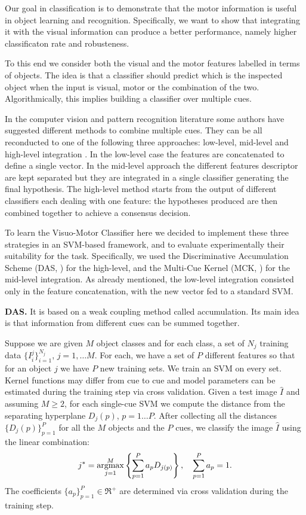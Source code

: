 Our goal in classification is to demonstrate that the motor information is
useful in object learning and recognition. Specifically,  we want 
to show that integrating it with the visual information can 
produce a better performance, namely higher classificaton 
rate and robusteness.

To this end we consider both the visual and the motor features
labelled in terms of objects. The idea is that a classifier 
should predict which is the inspected object when the input is
 visual, motor or the combination 
of the two.
Algorithmically, this implies building a classifier over multiple cues.

In the computer vision and pattern recognition literature 
some authors have suggested different methods to combine
multiple cues. They can be all reconducted to one of the 
following three approaches: low-level, mid-level and high-level
integration \cite{Polikar2006,sanderson2004}. 
In the low-level case the features are concatenated
to define a single vector. In the mid-level approach
the different features descriptor are kept separated 
but they are integrated in a single classifier generating the
final hypothesis. The high-level method starts from
the output of different classifiers each dealing with one feature: 
the hypotheses produced are then combined together to
achieve a consensus decision.

To learn the Visuo-Motor Classifier here we decided to implement these three strategies in an SVM-based framework, and to evaluate
experimentally their suitability for the task. Specifically, 
we used the
Discriminative Accumulation Scheme (DAS, \cite{DAS}) for
the high-level, and the Multi-Cue Kernel (MCK, \cite{MCK}) for the
mid-level integration.
As already mentioned, the low-level integration consisted only in the feature concatenation, with the new vector fed to a standard SVM.


\vspace{0.5cm}

\noindent\textbf{DAS.} It is based on a weak coupling method called accumulation. Its main 
idea is that information from different cues can be summed together.

Suppose we are given $M$ object classes and for each class, a set
of $N_{j}$ training data $\{I^{j}_{i}\}_{i=1}^{N_{j}}$,
$j=1,\ldots M$. For each, we have a set of $P$ different
features so that for an object $j$ we have $P$ new training sets.
We train an SVM on every set. Kernel functions may differ from cue to
cue and model parameters can be estimated during the training step
via cross validation. Given a test image $\hat{I}$ and assuming
$M\geq2$, for each single-cue SVM we compute the distance from the
separating hyperplane $D_{j}(p)$, $p=1\ldots P$.
After collecting all the distances $\{D_{j}(p)\}_{p=1}^{P}$ for
all the $M$ objects  and the $P$ cues, we classify the image
$\hat{I}$ using the linear combination:
\begin{equation}
j^{*}=\operatorname*{argmax}_{j=1}^{M} \left \{\sum_{p=1}^{P}a_{p}D_{j(p)} \right \}, \quad
\sum_{p=1}^{P}a_{p}=1. \label{eq:DAS}
\end{equation}
The coefficients $\{a_{p}\}_{p=1}^{P}\in \Re^{+}$ are determined
via cross validation during the training step.

